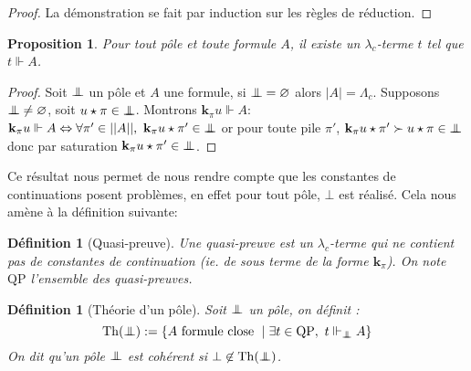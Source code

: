 \documentclass[a4paper,12pt]{article}
\newtheorem{prop}[theo]{Proposition}
\newtheorem{defi}[theo]{Définition}
\theoremstyle{rmqstyle}
\newcommand{\set}[1]{\{#1\}}
\newcommand{\abs}[1]{\lvert#1\rvert}
\newcommand{\abss}[1]{\lvert \lvert#1\rvert \rvert}
\newcommand{\QP}{\mathrm{QP}}
\renewcommand{\iff}{\Leftrightarrow}
\renewcommand{\k}{\mathbf{k}}
\newcommand{\pole}{{\protect\mathpalette{\protect\polehelper}{\bot}}} \def\polehelper#1#2{\mathrel{\rlap{$#1#2$}\mkern3mu{#1#2}}}
\newcommand{\Th}{\mathrm{Th}}
\begin{document}
\begin{proof}
La démonstration se fait par induction sur les règles de réduction.
\end{proof}

\begin{prop}
Pour tout pôle et toute formule $A$, il existe un $\lambda_c$-terme $t$ tel que $t \Vdash A$.
\end{prop}

\begin{proof}
Soit $\pole$ un pôle et $A$ une formule, si $\pole = \varnothing$ alors $\abs{A} = \Lambda_c$. Supposons $\pole \neq \varnothing$, soit $u \star \pi \in \pole$. Montrons $\k_\pi u \Vdash A$:\\
$\k_\pi u \Vdash A \iff \forall \pi' \in \abss{A}, \  \k_\pi u \star \pi' \in \pole$ or pour toute pile $\pi'$, $\k_\pi u \star \pi' \succ u \star \pi \in \pole$ donc par saturation $\k_\pi u \star \pi' \in \pole$.
\end{proof}

Ce résultat nous permet de nous rendre compte que les constantes de continuations posent problèmes, en effet pour tout pôle, $\bot$ est réalisé. Cela nous amène à la définition suivante:

\begin{defi}[Quasi-preuve]
Une quasi-preuve est un $\lambda_c$-terme qui ne contient pas de constantes de continuation (ie. de sous terme de la forme $\k_\pi$). On note $\QP$ l'ensemble des quasi-preuves.
\end{defi}

\begin{defi}[Théorie d'un pôle]
Soit $\pole$ un pôle, on définit :
$$ \Th(\pole) := \set{ A \text{ formule close } \mid \exists t \in \QP, \ t \Vdash_\pole A }$$
On dit qu'un pôle $\pole$ est cohérent si $\bot \not \in \Th(\pole)$.
\end{defi}
\end{document}
